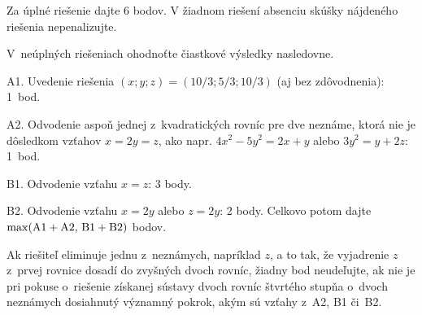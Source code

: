 {\schemaABC
Za úplné riešenie dajte 6 bodov. V žiadnom riešení absenciu skúšky nájdeného riešenia nepenalizujte.

V~neúplných riešeniach ohodnoťte čiastkové výsledky nasledovne.
\item{A1.} Uvedenie riešenia $(x;y;z)=(10/3;5/3;10/3)$ (aj bez zdôvodnenia): 1~bod.
\item{A2.} Odvodenie aspoň jednej z~kvadratických rovníc pre dve neznáme, ktorá nie je dôsledkom vzťahov $x=2y=z$, ako napr. $4x^2-5y^2=2x+y$ alebo
$3y^2=y+2z$: 1~bod.
\item{B1.} Odvodenie vzťahu $x=z$: 3 body.
\item{B2.} Odvodenie vzťahu $x=2y$ alebo $z=2y$: 2 body.
\endgraf\noindent
Celkovo potom dajte $\rm\max(A1+A2,\, B1+B2)$ bodov.

Ak riešiteľ eliminuje jednu z~neznámych, napríklad $z$,
a to tak, že vyjadrenie $z$ z~prvej rovnice dosadí do zvyšných
dvoch rovníc, žiadny bod neudeľujte, ak nie je pri pokuse o~riešenie
získanej sústavy dvoch rovníc štvrtého stupňa o~dvoch neznámych dosiahnutý
významný pokrok, akým sú vzťahy z~A2, B1 či~B2.
\endschema
}


